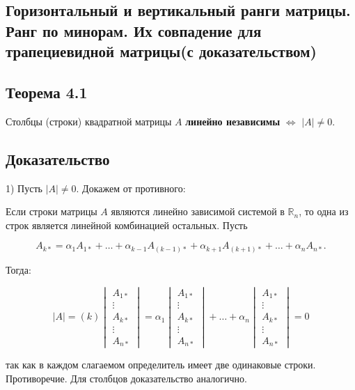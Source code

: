 {
\subsection{Горизонтальный и вертикальный ранги матрицы. Ранг по минорам. Их совпадение для трапециевидной матрицы(с доказательством)}

\subsection*{Теорема 4.1}

Столбцы (строки) квадратной матрицы \( A \) \textbf{линейно независимы} \( \iff \) \( |A| \neq 0 \).

\subsection*{Доказательство}

1) Пусть \( |A| \neq 0 \). Докажем от противного: 

Если строки матрицы \( A \) являются линейно зависимой системой в \( \mathbb{R}_n \), то одна из строк является линейной комбинацией остальных. Пусть 



\[
A_{k*} = \alpha_1 A_{1*} + \dots + \alpha_{k-1} A_{(k-1)*} + \alpha_{k+1} A_{(k+1)*} + \dots + \alpha_n A_{n*}.
\]



Тогда:



\[
|A| = (k)
\begin{vmatrix}
A_{1*} \\
\vdots \\
A_{k*} \\
\vdots \\
A_{n*}
\end{vmatrix}
=
\alpha_1
\begin{vmatrix}
A_{1*} \\
\vdots \\
A_{k*} \\
\vdots \\
A_{n*}
\end{vmatrix} 
+ \dots + 
\alpha_n
\begin{vmatrix}
A_{1*} \\
\vdots \\
A_{k*} \\
\vdots \\
A_{n*}
\end{vmatrix} = 0
\]

так как в каждом слагаемом определитель имеет две одинаковые строки.  Противоречие. 
Для столбцов доказательство аналогично.


}
